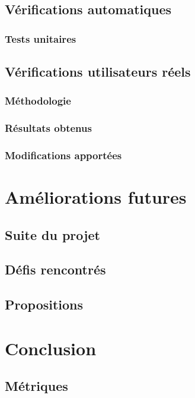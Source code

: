 \documentclass{EPL-master-thesis-covers-FR}
\begin{document}

		\section{Vérifications automatiques}

			\subsection*{Tests unitaires}

			

		\section{Vérifications utilisateurs réels}


			\subsection*{Méthodologie}

				

			\subsection*{Résultats obtenus}

				

			\subsection*{Modifications apportées}

		

	\chapter{Améliorations futures}


		\section{Suite du projet}
			\label{ref:suite_projet}

		

		\section{Défis rencontrés}

			

		\section{Propositions}

			
	\chapter{Conclusion}

		

		\section{Métriques}
		

	
	
		

	

	\setlength{\parskip}{0em}
	\backcoverpage
\end{document}
